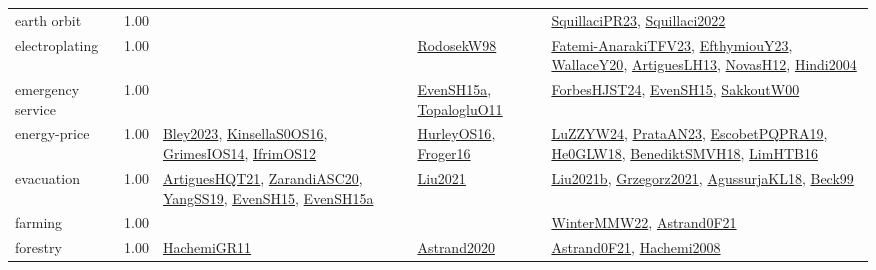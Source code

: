 {\begin{longtable}{p{3cm}r>{\raggedright\arraybackslash}p{6cm}>{\raggedright\arraybackslash}p{6cm}>{\raggedright\arraybackslash}p{8cm}}
\index{earth orbit}\index{ApplicationAreas!earth orbit}earth orbit &  1.00 &  &  & \hyperref[detail:SquillaciPR23]{SquillaciPR23}, \hyperref[detail:Squillaci2022]{Squillaci2022}\\
\index{electroplating}\index{ApplicationAreas!electroplating}electroplating &  1.00 &  & \hyperref[detail:RodosekW98]{RodosekW98} & \hyperref[detail:Fatemi-AnarakiTFV23]{Fatemi-AnarakiTFV23}, \hyperref[detail:EfthymiouY23]{EfthymiouY23}, \hyperref[detail:WallaceY20]{WallaceY20}, \hyperref[detail:ArtiguesLH13]{ArtiguesLH13}, \hyperref[detail:NovasH12]{NovasH12}, \hyperref[detail:Hindi2004]{Hindi2004}\\
\index{emergency service}\index{ApplicationAreas!emergency service}emergency service &  1.00 &  & \hyperref[detail:EvenSH15a]{EvenSH15a}, \hyperref[detail:TopalogluO11]{TopalogluO11} & \hyperref[detail:ForbesHJST24]{ForbesHJST24}, \hyperref[detail:EvenSH15]{EvenSH15}, \hyperref[detail:SakkoutW00]{SakkoutW00}\\
\index{energy-price}\index{ApplicationAreas!energy-price}energy-price &  1.00 & \hyperref[detail:Bley2023]{Bley2023}, \hyperref[detail:KinsellaS0OS16]{KinsellaS0OS16}, \hyperref[detail:GrimesIOS14]{GrimesIOS14}, \hyperref[detail:IfrimOS12]{IfrimOS12} & \hyperref[detail:HurleyOS16]{HurleyOS16}, \hyperref[detail:Froger16]{Froger16} & \hyperref[detail:LuZZYW24]{LuZZYW24}, \hyperref[detail:PrataAN23]{PrataAN23}, \hyperref[detail:EscobetPQPRA19]{EscobetPQPRA19}, \hyperref[detail:He0GLW18]{He0GLW18}, \hyperref[detail:BenediktSMVH18]{BenediktSMVH18}, \hyperref[detail:LimHTB16]{LimHTB16}\\
\index{evacuation}\index{ApplicationAreas!evacuation}evacuation &  1.00 & \hyperref[detail:ArtiguesHQT21]{ArtiguesHQT21}, \hyperref[detail:ZarandiASC20]{ZarandiASC20}, \hyperref[detail:YangSS19]{YangSS19}, \hyperref[detail:EvenSH15]{EvenSH15}, \hyperref[detail:EvenSH15a]{EvenSH15a} & \hyperref[detail:Liu2021]{Liu2021} & \hyperref[detail:Liu2021b]{Liu2021b}, \hyperref[detail:Grzegorz2021]{Grzegorz2021}, \hyperref[detail:AgussurjaKL18]{AgussurjaKL18}, \hyperref[detail:Beck99]{Beck99}\\
\index{farming}\index{ApplicationAreas!farming}farming &  1.00 &  &  & \hyperref[detail:WinterMMW22]{WinterMMW22}, \hyperref[detail:Astrand0F21]{Astrand0F21}\\
\index{forestry}\index{ApplicationAreas!forestry}forestry &  1.00 & \hyperref[detail:HachemiGR11]{HachemiGR11} & \hyperref[detail:Astrand2020]{Astrand2020} & \hyperref[detail:Astrand0F21]{Astrand0F21}, \hyperref[detail:Hachemi2008]{Hachemi2008}\\

\end{longtable}}
